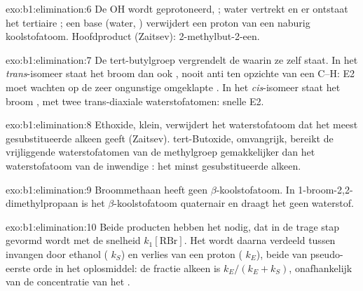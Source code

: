 \begin{solution}{exo:b1:elimination:6}
De OH wordt geprotoneerd, ; water vertrekt en
er ontstaat het tertiaire  ; een base (water, )
verwijdert een proton van een naburig koolstofatoom. Hoofdproduct
(Zaitsev): 2-methylbut-2-een.
\end{solution}

\begin{solution}{exo:b1:elimination:7}
De tert-butylgroep vergrendelt de  waarin ze zelf 
staat. In het \textit{trans}-isomeer staat het broom dan ook ,
nooit anti ten opzichte van een C--H: E2 moet wachten op de zeer
ongunstige omgeklapte . In het \textit{cis}-isomeer staat het broom
, met twee trans-diaxiale waterstofatomen: snelle E2.
\end{solution}

\begin{solution}{exo:b1:elimination:8}
Ethoxide, klein, verwijdert het waterstofatoom dat het meest
gesubstitueerde alkeen geeft (Zaitsev). tert-Butoxide, omvangrijk,
bereikt de vrijliggende waterstofatomen van de methylgroep gemakkelijker
dan het waterstofatoom van de inwendige : het minst
gesubstitueerde alkeen.
\end{solution}

\begin{solution}{exo:b1:elimination:9}
Broommethaan heeft geen $\beta$-koolstofatoom. In
1-broom-2,2-dimethylpropaan is het $\beta$-koolstofatoom quaternair en
draagt het geen waterstof.
\end{solution}

\begin{solution}{exo:b1:elimination:10}
Beide producten hebben het  nodig, dat in de trage stap
gevormd wordt met de snelheid $k_1[\mathrm{RBr}]$. Het wordt daarna
verdeeld tussen invangen door ethanol ( $k_S$) en
verlies van een proton ( $k_E$), beide van
pseudo-eerste orde in het oplosmiddel: de fractie alkeen is
$k_E/(k_E + k_S)$, onafhankelijk van de concentratie van het .
\end{solution}

